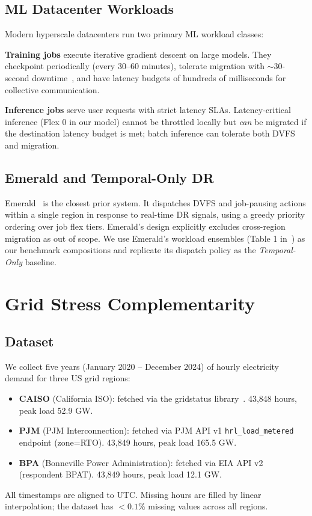 \documentclass[sigplan,10pt,review]{acmart}
\begin{document}
\subsection{ML Datacenter Workloads}

Modern hyperscale datacenters run two primary ML workload classes:

\textbf{Training jobs} execute iterative gradient descent on large models.
They checkpoint periodically (every 30--60 minutes), tolerate migration with
${\sim}30$-second downtime~\cite{trainmover2024}, and have latency budgets of
hundreds of milliseconds for collective communication.

\textbf{Inference jobs} serve user requests with strict latency SLAs.
Latency-critical inference (Flex 0 in our model) cannot be throttled locally
but \emph{can} be migrated if the destination latency budget is met; batch
inference can tolerate both DVFS and migration.

\subsection{Emerald and Temporal-Only DR}

Emerald~\cite{emerald2025} is the closest prior system.  It dispatches DVFS
and job-pausing actions within a single region in response to real-time DR
signals, using a greedy priority ordering over job flex tiers.  Emerald's
design explicitly excludes cross-region migration as out of scope.  We use
Emerald's workload ensembles (Table 1 in~\cite{emerald2025}) as our benchmark
compositions and replicate its dispatch policy as the \emph{Temporal-Only}
baseline.


\section{Grid Stress Complementarity}
\label{sec:complementarity}

\subsection{Dataset}

We collect five years (January 2020 -- December 2024) of hourly electricity
demand for three US grid regions:
\begin{itemize}
  \item \textbf{CAISO} (California ISO): fetched via the gridstatus
        library~\cite{gridstatus}.  43,848 hours, peak load 52.9 GW.
  \item \textbf{PJM} (PJM Interconnection): fetched via PJM API v1
        \texttt{hrl\_load\_metered} endpoint (zone=RTO).  43,849 hours,
        peak load 165.5 GW.
  \item \textbf{BPA} (Bonneville Power Administration): fetched via EIA API
        v2 (respondent BPAT).  43,849 hours, peak load 12.1 GW.
\end{itemize}
All timestamps are aligned to UTC.  Missing hours are filled by linear
interpolation; the dataset has $<0.1\%$ missing values across all regions.
\end{document}
